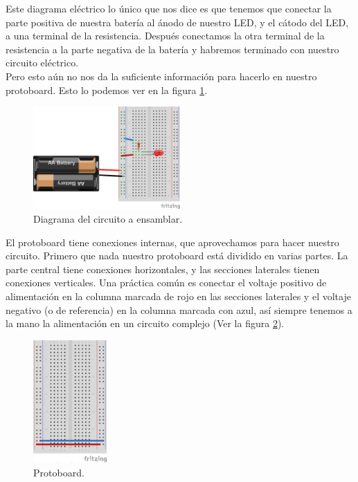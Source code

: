     Este diagrama eléctrico lo único que nos dice es que tenemos que conectar la parte positiva de nuestra batería al ánodo de nuestro LED, y el cátodo del LED, a una terminal de la resistencia. Después conectamos la otra terminal de la resistencia a la parte negativa de la batería y habremos terminado con nuestro circuito eléctrico. \\

    Pero esto aún no nos da la suficiente información para hacerlo en nuestro protoboard. Esto lo podemos ver en la figura \ref{dia:cir}. \\

    \begin{figure}[h]
    	\begin{center}
    		\includegraphics[width=0.5\textwidth]{images/LED-bateria.png}
    		\caption{Diagrama del circuito a ensamblar.}
    		\label{dia:cir}
    	\end{center}
    \end{figure}

    El protoboard tiene conexiones internas, que aprovechamos para hacer nuestro circuito. Primero que nada nuestro protoboard está dividido en varias partes. La parte central tiene conexiones horizontales, y las secciones laterales tienen conexiones verticales. Una práctica común es conectar el voltaje positivo de alimentación en la columna marcada de rojo en las secciones laterales y el voltaje negativo (o de referencia) en la columna marcada con azul, así siempre tenemos a la mano la alimentación en un circuito complejo (Ver la figura \ref{dia:proto}). \\

    \begin{figure}[h]
    	\begin{center}
    		\includegraphics[width=0.25\textwidth]{images/protoboard.png}
    		\caption{Protoboard.}
    		\label{dia:proto}
    	\end{center}
    \end{figure}

